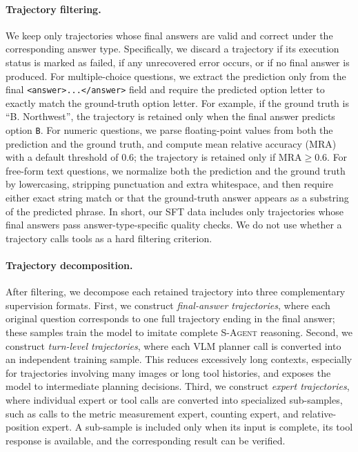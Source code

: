 \paragraph{Trajectory filtering.}
We keep only trajectories whose final answers are valid and correct under the corresponding answer type. 
Specifically, we discard a trajectory if its execution status is marked as failed, if any unrecovered error occurs, or if no final answer is produced. 
For multiple-choice questions, we extract the prediction only from the final \texttt{<answer>...</answer>} field and require the predicted option letter to exactly match the ground-truth option letter. 
For example, if the ground truth is ``B. Northwest'', the trajectory is retained only when the final answer predicts option \texttt{B}. 
For numeric questions, we parse floating-point values from both the prediction and the ground truth, and compute mean relative accuracy (MRA) with a default threshold of 0.6; the trajectory is retained only if $\mathrm{MRA} \geq 0.6$. 
For free-form text questions, we normalize both the prediction and the ground truth by lowercasing, stripping punctuation and extra whitespace, and then require either exact string match or that the ground-truth answer appears as a substring of the predicted phrase. 
In short, our SFT data includes only trajectories whose final answers pass answer-type-specific quality checks. 
We do not use whether a trajectory calls tools as a hard filtering criterion.

\paragraph{Trajectory decomposition.}
After filtering, we decompose each retained trajectory into three complementary supervision formats. 
First, we construct \emph{final-answer trajectories}, where each original question corresponds to one full trajectory ending in the final answer; these samples train the model to imitate complete \textsc{S-Agent} reasoning. 
Second, we construct \emph{turn-level trajectories}, where each VLM planner call is converted into an independent training sample. 
This reduces excessively long contexts, especially for trajectories involving many images or long tool histories, and exposes the model to intermediate planning decisions. 
Third, we construct \emph{expert trajectories}, where individual expert or tool calls are converted into specialized sub-samples, such as calls to the metric measurement expert, counting expert, and relative-position expert. 
A sub-sample is included only when its input is complete, its tool response is available, and the corresponding result can be verified.

